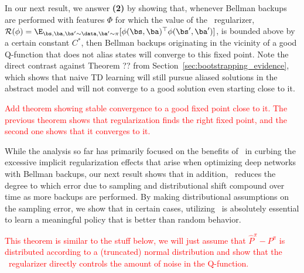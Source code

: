 In our next result, we answer \textbf{(2)} by showing that, whenever Bellman backups are performed with features $\Phi$ for which the value of the \methodname\ regularizer,
$\mathcal{R}(\phi) = \E_{\bs, \ba, \bs' \sim \data, \ba' \sim \pi}[\phi(\bs, \ba)^\top \phi(\bs', \ba')]$, is bounded above by a certain constant $C^*$, then  Bellman backups originating in the vicinity of a good Q-function that does not alias states will converge to this fixed point. Note the direct contrast against Theorem ?? from Section~\ref{sec:bootstrapping_evidence},
which shows that naive TD learning will still pursue aliased solutions in the abstract model and will not converge to a good solution even starting close to it.

\textcolor{red}{Add theorem showing stable convergence to a good fixed point close to it. The previous theorem shows that regularization finds the right fixed point, and the second one shows that it converges to it.}

While the analysis so far has primarily focused on the benefits of \methodname\ in curbing the excessive implicit regularization effects that arise when optimizing deep networks with Bellman backups, our next result shows that in addition, \methodname\ reduces the degree to which error due to sampling and distributional shift compound over time as more backups are performed. By making distributional assumptions on the sampling error, we show that in certain cases, utilizing \methodname\ is absolutely essential to learn a meaningful policy that is better than random behavior.

\textcolor{red}{This theorem is similar to the stuff below, we will just assume that $\hat{P}^\pi- P^\pi$ is distributed according to a (truncated) normal distribution and show that the \methodname\ regularizer directly controls the amount of noise in the Q-function.}

